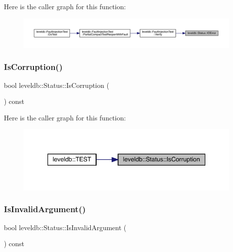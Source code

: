Here is the caller graph for this function\+:
\nopagebreak
\begin{figure}[H]
\begin{center}
\leavevmode
\includegraphics[width=350pt]{classleveldb_1_1_status_ada6143081d41803808f77287153f96b7_icgraph}
\end{center}
\end{figure}
\mbox{\label{classleveldb_1_1_status_a83077fd4bb808556e6290a25187e2cb3}} 
\subsubsection{\texorpdfstring{IsCorruption()}{IsCorruption()}}
{\footnotesize\ttfamily bool leveldb\+::\+Status\+::\+Is\+Corruption (\begin{DoxyParamCaption}{ }\end{DoxyParamCaption}) const\hspace{0.3cm}{\ttfamily [inline]}}

Here is the caller graph for this function\+:
\nopagebreak
\begin{figure}[H]
\begin{center}
\leavevmode
\includegraphics[width=336pt]{classleveldb_1_1_status_a83077fd4bb808556e6290a25187e2cb3_icgraph}
\end{center}
\end{figure}
\mbox{\label{classleveldb_1_1_status_a104680c351113a93b9c8d2b23f88d87e}} 
\subsubsection{\texorpdfstring{IsInvalidArgument()}{IsInvalidArgument()}}
{\footnotesize\ttfamily bool leveldb\+::\+Status\+::\+Is\+Invalid\+Argument (\begin{DoxyParamCaption}{ }\end{DoxyParamCaption}) const\hspace{0.3cm}{\ttfamily [inline]}}

